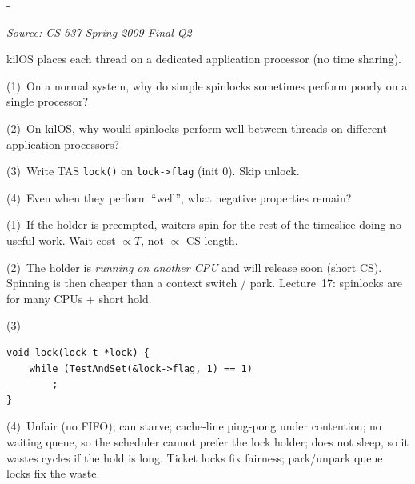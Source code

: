 \documentclass[11pt,a4paper]{article}
\makeatletter
\newcommand{\keepspace}[1]{\par\penalty-100\begingroup
  \setlength{\dimen@}{#1}\dimen@ii\pagegoal\advance\dimen@ii-\pagetotal
  \ifdim\dimen@>\dimen@ii\ifdim\dimen@ii>\z@\vfil\fi\break\fi\endgroup}
\newcounter{qn}[section]
\newenvironment{Qn}[4]{%
  \refstepcounter{qn}\keepspace{7\baselineskip}%
  \begin{tcolorbox}[qboxstyle, title={Q\thesection.\theqn\ \ [#1 \textbar\ #2]\ \ #4}]%
  {\footnotesize\color{g3}\textit{Source: #3}}\par\smallskip%
}{%
  \end{tcolorbox}%
}
\newenvironment{Sol}{%
  \begin{tcolorbox}[sboxstyle, title={Solution}]%
}{%
  \end{tcolorbox}\vspace{0.35em}%
}
\makeatother
\begin{document}
\begin{Qn}{Medium-Hard}{Lect 17}{CS-537 Spring 2009 Final Q2}{Why spinlocks hurt on 1 CPU and help on $N$ CPUs}
kilOS places each thread on a dedicated application processor (no time sharing).

(1)~On a normal system, why do simple spinlocks sometimes perform poorly on a single processor?

(2)~On kilOS, why would spinlocks perform well between threads on different application processors?

(3)~Write TAS \texttt{lock()} on \texttt{lock->flag} (init 0). Skip unlock.

(4)~Even when they perform ``well'', what negative properties remain?
\end{Qn}
\begin{Sol}
(1)~If the holder is preempted, waiters spin for the rest of the timeslice doing no useful work. Wait cost $\propto T$, not $\propto$ CS length.

(2)~The holder is \emph{running on another CPU} and will release soon (short CS). Spinning is then cheaper than a context switch / park. Lecture~17: spinlocks are for many CPUs + short hold.

(3)
\begin{lstlisting}[numbers=none]
void lock(lock_t *lock) {
    while (TestAndSet(&lock->flag, 1) == 1)
        ;
}
\end{lstlisting}

(4)~Unfair (no FIFO); can starve; cache-line ping-pong under contention; no waiting queue, so the scheduler cannot prefer the lock holder; does not sleep, so it wastes cycles if the hold is long. Ticket locks fix fairness; park/unpark queue locks fix the waste.
\end{Sol}
\end{document}
